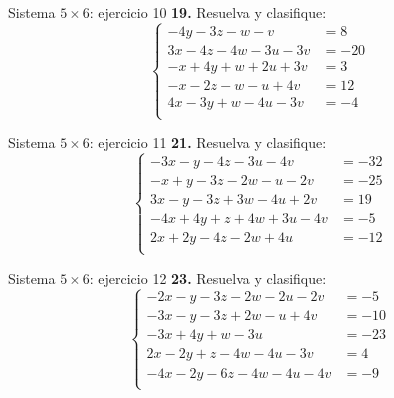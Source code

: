 \documentclass[aspectratio=169,9pt]{beamer}
\theoremstyle{remark}
\begin{document}
\begin{frame}{Sistema $5\times 6$: ejercicio 10}
\scriptsize
\textbf{19.} Resuelva y clasifique:
\[\left\{\begin{aligned}
-4y-3z-w-v&=8\\
3x-4z-4w-3u-3v&=-20\\
-x+4y+w+2u+3v&=3\\
-x-2z-w-u+4v&=12\\
4x-3y+w-4u-3v&=-4\\
\end{aligned}\right.\]
\end{frame}
\begin{frame}{Sistema $5\times 6$: ejercicio 11}
\scriptsize
\textbf{21.} Resuelva y clasifique:
\[\left\{\begin{aligned}
-3x-y-4z-3u-4v&=-32\\
-x+y-3z-2w-u-2v&=-25\\
3x-y-3z+3w-4u+2v&=19\\
-4x+4y+z+4w+3u-4v&=-5\\
2x+2y-4z-2w+4u&=-12\\
\end{aligned}\right.\]
\end{frame}
\begin{frame}{Sistema $5\times 6$: ejercicio 12}
\scriptsize
\textbf{23.} Resuelva y clasifique:
\[\left\{\begin{aligned}
-2x-y-3z-2w-2u-2v&=-5\\
-3x-y-3z+2w-u+4v&=-10\\
-3x+4y+w-3u&=-23\\
2x-2y+z-4w-4u-3v&=4\\
-4x-2y-6z-4w-4u-4v&=-9\\
\end{aligned}\right.\]
\end{frame}
\end{document}

